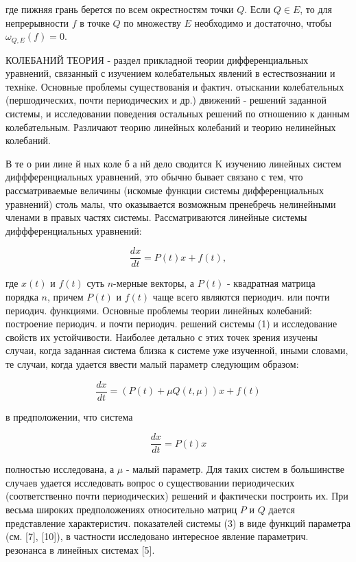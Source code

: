 \documentclass[10pt]{article}
\begin{document}
где пижняя грань берется по всем окрестностям точки $Q$. Если $Q \in E$, то для непрерывности $f$ в точке $Q$ по множеству $E$ необходимо и достаточно, чтобы $\omega_{Q, E}(f)=0$.



КОЛЕБАНИЙ ТЕОРИЯ - раздел прикладной теории дифференциальных уравнений, связанный с изучением колебательных явлений в естествознании и техніке. Основные проблемы существованія и фактич. отыскании колебательных (першодических, почти периодических и др.) движений - решений заданной системы, и исследовании поведения остальных решений по отношению к данным колебательным. Различают теорию линейных колебаний и теорию нелинейных колебаний.



В те о рии лине й ных коле б а нй дело сводится $\mathrm{K}$ изучению линейных систем диффференциальных уравнений, это обычно бывает связано с тем, что рассматриваемые величины (искомые функции системы дифференциальных уравнений) столь малы, что оказывается возможным пренебречь нелинейными членами в правых частях системы. Рассматриваются линейные системы диффференциальных уравнений:



\[

\frac{d x}{d t}=P(t) x+f(t),

\]



где $x(t)$ и $f(t)$ суть $n$-мерные векторы, а $P(t)$ - квадратная матрица порядка $n$, причем $P(t)$ и $f(t)$ чаще всего являются периодич. или почти периодич. функциями. Основные проблемы теории линейных колебаний: построение периодич. и почти периодич. решений системы (1) и исследование свойств их устойчивости. Наиболее детально с этих точек зрения изучены случаи, когда заданная система близка к системе уже изученной, иными словами, те случаи, когда удается ввести малый параметр следующим образом:



\[

\frac{d x}{d t}=(P(t)+\mu Q(t, \mu)) x+f(t)

\]



в предположении, что система



\[

\frac{d x}{d t}=P(t) x

\]



полностью исследована, а $\mu$ - малый параметр. Для таких систем в большинстве случаев удается исследовать вопрос о существовании периодических (соответственно почти периодических) решений и фактически построить их. При весьма широких предположениях относительно матриц $P$ и $Q$ дается представление характеристич. показателей системы (3) в виде функций параметра (см. [7], [10]), в частности исследовано интересное явление параметрич. резонанса в линейных системах [5].
\end{document}
